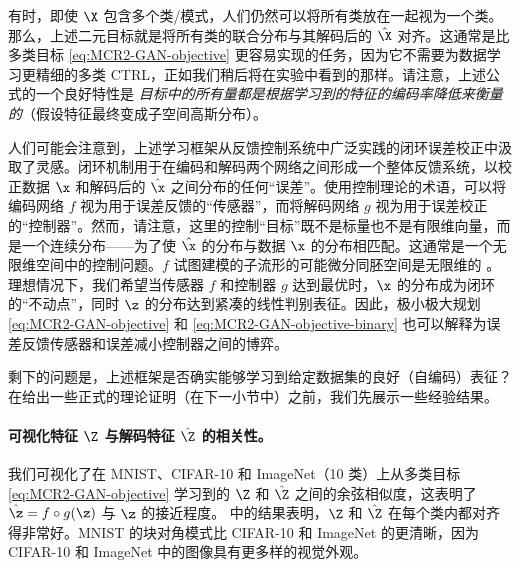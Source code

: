 \documentclass[../../book-main_zh.tex]{subfiles}
\begin{document}
有时，即使 $\X$ 包含多个类/模式，人们仍然可以将所有类放在一起视为一个类。那么，上述二元目标就是将所有类的联合分布与其解码后的 $\hat \X$ 对齐。这通常是比多类目标 \eqref{eq:MCR2-GAN-objective} 更容易实现的任务，因为它不需要为数据学习更精细的多类 CTRL，正如我们稍后将在实验中看到的那样。请注意，上述公式的一个良好特性是 {\em 目标中的所有量都是根据学习到的特征的编码率降低来衡量的}（假设特征最终变成子空间高斯分布）。

人们可能会注意到，上述学习框架从反馈控制系统中广泛实践的闭环误差校正中汲取了灵感。闭环机制用于在编码和解码两个网络之间形成一个整体反馈系统，以校正数据 $\x$ 和解码后的 $\hat \x$ 之间分布的任何“误差”。使用控制理论的术语，可以将编码网络 $f$ 视为用于误差反馈的“传感器”，而将解码网络 $g$ 视为用于误差校正的“控制器”。然而，请注意，这里的控制“目标”既不是标量也不是有限维向量，而是一个连续分布——为了使 $\hat \x$ 的分布与数据 $\x$ 的分布相匹配。这通常是一个无限维空间中的控制问题。$f$ 试图建模的子流形的可能微分同胚空间是无限维的 \cite{Lee2002IntroductionTS}。理想情况下，我们希望当传感器 $f$ 和控制器 $g$ 达到最优时，$\x$ 的分布成为闭环的“不动点”，同时 $\z$ 的分布达到紧凑的线性判别表征。因此，极小极大规划 \eqref{eq:MCR2-GAN-objective} 和 \eqref{eq:MCR2-GAN-objective-binary} 也可以解释为误差反馈传感器和误差减小控制器之间的博弈。

剩下的问题是，上述框架是否确实能够学习到给定数据集的良好（自编码）表征？在给出一些正式的理论证明（在下一小节中）之前，我们先展示一些经验结果。

\paragraph{可视化特征 $\Z$ 与解码特征 $\hat \Z$ 的相关性。} 我们可视化了在 MNIST、CIFAR-10 和 ImageNet（10 类）上从多类目标 \eqref{eq:MCR2-GAN-objective} 学习到的 $\Z$ 和 $\hat{\Z}$ 之间的余弦相似度，这表明了 $\hat{\z} = f\circ g(\z)$ 与 $\z$ 的接近程度。 中的结果表明，$\Z$ 和 $\hat{\Z}$ 在每个类内都对齐得非常好。MNIST 的块对角模式比 CIFAR-10 和 ImageNet 的更清晰，因为 CIFAR-10 和 ImageNet 中的图像具有更多样的视觉外观。
\end{document}
